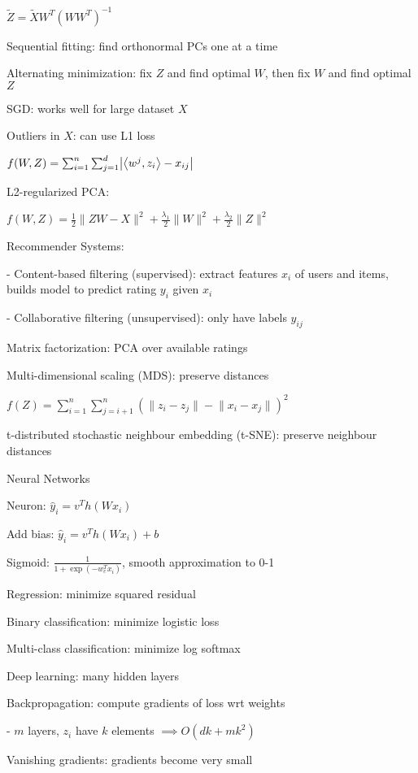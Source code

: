 \documentclass[10pt]{article}
\makeatletter
\newcommand{\tab}{\hspace{.02\textwidth}}
\newcommand{\agb}[1]{\left\langle#1\right\rangle}
\newcommand{\abs}[1]{\left|#1\right|}
\let\originalleft\left
\let\originalright\right
\renewcommand{\left}{\mathopen{}\mathclose\bgroup\originalleft}
\renewcommand{\right}{\aftergroup\egroup\originalright}
\renewcommand{\section}{\@startsection{section}{1}{0ex}{-1ex}{0.7ex}
                        {\normalfont\normalsize\bfseries}}
\newcommand{\norm}[1]{\lVert #1 \rVert}
\makeatother
\begin{document}
\begin{multicols*}{3}
\tab $\tilde Z=\tilde XW^T(WW^T)^{-1}$

Sequential fitting: find orthonormal PCs one at a time

Alternating minimization: fix $Z$ and find optimal $W$, then fix $W$ and find optimal $Z$

SGD: works well for large dataset $X$

Outliers in $X$: can use L1 loss

\tab $f(W,Z)=\sum_{i=1}^n\sum_{j=1}^d\abs{\agb{w^j,z_i}-x_{ij}}$

L2-regularized PCA: 

\tab $f(W,Z)=\frac 12\norm{ZW-X}^2+\frac{\lambda_1}{2}\norm W^2+\frac{\lambda_2}{2}\norm Z^2$

Recommender Systems:

- Content-based filtering (supervised): extract features $x_i$ of users and items, builds model to predict rating $y_i$ given $x_i$

- Collaborative filtering (unsupervised): only have labels $y_{ij}$

Matrix factorization: PCA over available ratings

Multi-dimensional scaling (MDS): preserve distances

\tab $f(Z)=\sum_{i=1}^n\sum_{j=i+1}^n(\norm{z_i-z_j}-\norm{x_i-x_j})^2$

t-distributed stochastic neighbour embedding (t-SNE): preserve neighbour distances

\section{Neural Networks}

Neuron: $\hat y_i=v^Th(Wx_i)$

Add bias: $\hat y_i=v^Th(Wx_i)+b$

Sigmoid: $\frac{1}{1+\exp(-w_c^Tx_i)}$, smooth approximation to 0-1

Regression: minimize squared residual

Binary classification: minimize logistic loss

Multi-class classification: minimize log softmax

Deep learning: many hidden layers

Backpropagation: compute gradients of loss wrt weights 

- $m$ layers, $z_i$ have $k$ elements $\implies O(dk+mk^2)$

Vanishing gradients: gradients become very small


\end{multicols*}
\end{document}

